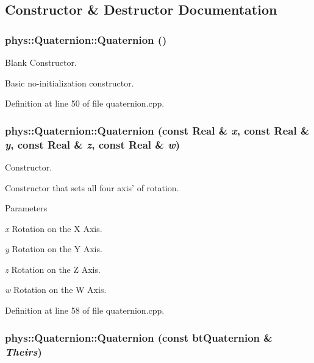 \subsection{Constructor \& Destructor Documentation}
\hypertarget{classphys_1_1Quaternion_aca4ee6fd6d3967f06cc4a32361fa5a62}{
\subsubsection[{Quaternion}]{\setlength{\rightskip}{0pt plus 5cm}phys::Quaternion::Quaternion ()}}
\label{df/d8c/classphys_1_1Quaternion_aca4ee6fd6d3967f06cc4a32361fa5a62}


Blank Constructor. 

Basic no-\/initialization constructor. 

Definition at line 50 of file quaternion.cpp.

\hypertarget{classphys_1_1Quaternion_ac8037875c08ce10c0195f3e6fd08b172}{
\subsubsection[{Quaternion}]{\setlength{\rightskip}{0pt plus 5cm}phys::Quaternion::Quaternion (const {\bf Real} \& {\em x}, \/  const {\bf Real} \& {\em y}, \/  const {\bf Real} \& {\em z}, \/  const {\bf Real} \& {\em w})}}
\label{df/d8c/classphys_1_1Quaternion_ac8037875c08ce10c0195f3e6fd08b172}


Constructor. 

Constructor that sets all four axis' of rotation. 
\begin{DoxyParams}{Parameters}
\item[{\em x}]Rotation on the X Axis. \item[{\em y}]Rotation on the Y Axis. \item[{\em z}]Rotation on the Z Axis. \item[{\em w}]Rotation on the W Axis. \end{DoxyParams}


Definition at line 58 of file quaternion.cpp.

\hypertarget{classphys_1_1Quaternion_ab9f13d19fe7d602d7c5feaed0aaf4620}{
\subsubsection[{Quaternion}]{\setlength{\rightskip}{0pt plus 5cm}phys::Quaternion::Quaternion (const btQuaternion \& {\em Theirs})}}
\label{df/d8c/classphys_1_1Quaternion_ab9f13d19fe7d602d7c5feaed0aaf4620}


